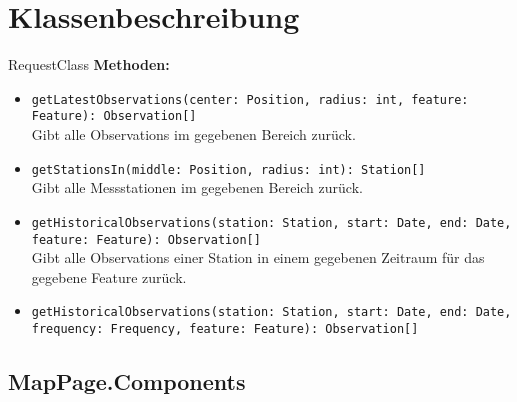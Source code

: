 \section{Klassenbeschreibung}

\begin{Class}{RequestClass}
    \textbf{Methoden:}
    \begin{itemize}
        \item \texttt{getLatestObservations(center: Position, radius: int, feature: Feature): Observation[]}
        \\Gibt alle Observations im gegebenen Bereich zurück.
        \item \texttt{getStationsIn(middle: Position, radius: int): Station[]}
        \\Gibt alle Messstationen im gegebenen Bereich zurück.
        \item \texttt{getHistoricalObservations(station: Station, start: Date, end: Date, feature: Feature): Observation[]}
        \\Gibt alle Observations einer Station in einem gegebenen Zeitraum für das gegebene Feature zurück.
        \item \texttt{getHistoricalObservations(station: Station, start: Date, end: Date, frequency: Frequency, feature: Feature): Observation[]}
        
    \end{itemize}
\end{Class}

\subsection{MapPage.Components}

